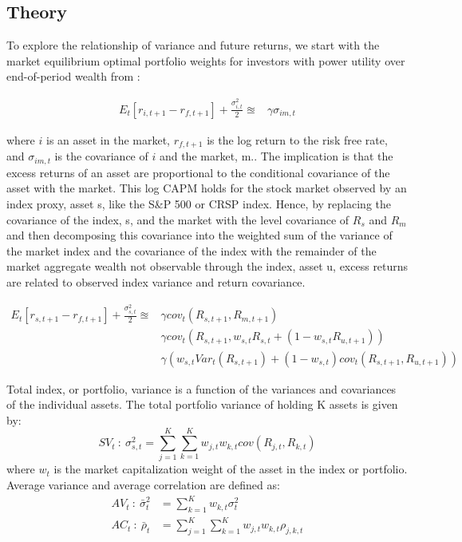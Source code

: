 \subsection{Theory}
To explore the relationship of variance and future returns, we start with the market equilibrium optimal portfolio weights for investors with power utility over end-of-period wealth from \citet{noauthor_strategic_nodate}:

\begin{align*}
E_{t}[r_{i,t+1}-r_{f,t+1}] + \frac{\sigma^{2}_{i,t}}{2} \approxeq& \gamma \sigma_{im,t}
\end{align*}

where $i$ is an asset in the market, $r_{f,t+1}$ is the log return to the risk free rate, and $\sigma_{im,t}$ is the covariance of $i$ and the market, m.. The implication is that the excess returns of an asset are proportional to the conditional covariance of the asset with the market. This log CAPM holds for the stock market observed by an index proxy, asset s, like the S\&P 500 or CRSP index. Hence, by replacing the covariance of the index, s, and the market with the level covariance of $R_{s}$ and $R_{m}$ and then decomposing this covariance into the weighted sum of the variance of the market index and the covariance of the index with the remainder of the market aggregate wealth not observable through the index, asset u, excess returns are related to observed index variance and return covariance.

\begin{align*}
E_{t}[r_{s,t+1}-r_{f,t+1}] + \frac{\sigma^{2}_{s,t}}{2} \approxeq& \gamma cov_{t}(R_{s,t+1},R_{m,t+1})\\
& \gamma cov_{t}(R_{s,t+1},w_{s,t}R_{s,t}+(1-w_{s,t}R_{u,t+1}))\\
& \gamma (w_{s,t}Var_{t}(R_{s,t+1})+(1-w_{s,t})cov_{t}(R_{s,t+1},R_{u,t+1}))
\end{align*}

Total index, or portfolio, variance is a function of the variances and covariances of the individual assets. The total portfolio variance of holding K assets is given by:
\begin{equation}
SV_{t} ~:~ \sigma^{2}_{s,t} =  \sum_{j=1}^{K}\sum_{k=1}^{K}w_{j,t}w_{k,t}cov(R_{j,t},R_{k,t})
\end{equation}
where $w_{t}$ is the market capitalization weight of the asset in the index or portfolio. Average variance and average correlation are defined as:
\begin{align}
AV_{t} ~:~ \bar{\sigma}^{2}_{t} &= \sum_{k=1}^{K}w_{k,t}\sigma^{2}_{t}\\
AC_{t} ~:~ \bar{\rho}_{t} &= \sum_{j=1}^{K}\sum_{k=1}^{K}w_{j,t}w_{k,t}\rho_{j,k,t}
\end{align}

